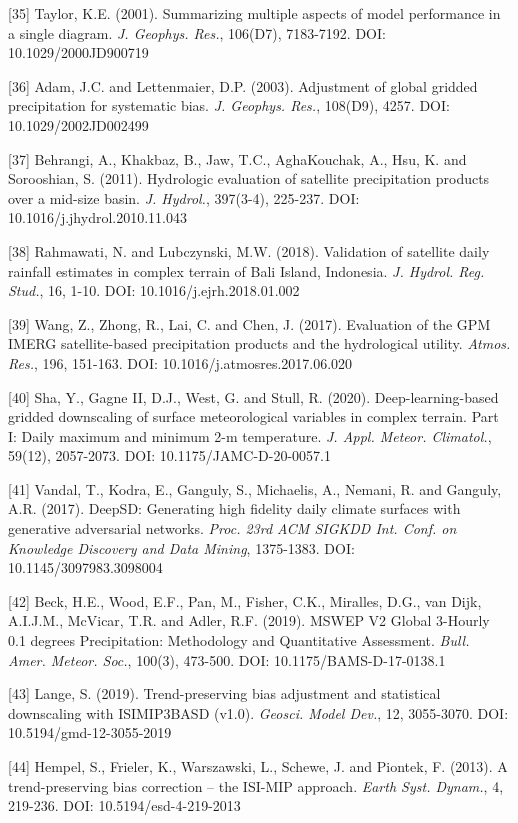 \documentclass[
]{article}
\begin{document}
{[}35{]} Taylor, K.E. (2001). Summarizing multiple aspects of model
performance in a single diagram. \emph{J. Geophys. Res.}, 106(D7),
7183-7192. DOI: 10.1029/2000JD900719

{[}36{]} Adam, J.C. and Lettenmaier, D.P. (2003). Adjustment of global
gridded precipitation for systematic bias. \emph{J. Geophys. Res.},
108(D9), 4257. DOI: 10.1029/2002JD002499

{[}37{]} Behrangi, A., Khakbaz, B., Jaw, T.C., AghaKouchak, A., Hsu, K.
and Sorooshian, S. (2011). Hydrologic evaluation of satellite
precipitation products over a mid-size basin. \emph{J. Hydrol.},
397(3-4), 225-237. DOI: 10.1016/j.jhydrol.2010.11.043

{[}38{]} Rahmawati, N. and Lubczynski, M.W. (2018). Validation of
satellite daily rainfall estimates in complex terrain of Bali Island,
Indonesia. \emph{J. Hydrol. Reg. Stud.}, 16, 1-10. DOI:
10.1016/j.ejrh.2018.01.002

{[}39{]} Wang, Z., Zhong, R., Lai, C. and Chen, J. (2017). Evaluation of
the GPM IMERG satellite-based precipitation products and the
hydrological utility. \emph{Atmos. Res.}, 196, 151-163. DOI:
10.1016/j.atmosres.2017.06.020

{[}40{]} Sha, Y., Gagne II, D.J., West, G. and Stull, R. (2020).
Deep-learning-based gridded downscaling of surface meteorological
variables in complex terrain. Part I: Daily maximum and minimum 2-m
temperature. \emph{J. Appl. Meteor. Climatol.}, 59(12), 2057-2073. DOI:
10.1175/JAMC-D-20-0057.1

{[}41{]} Vandal, T., Kodra, E., Ganguly, S., Michaelis, A., Nemani, R.
and Ganguly, A.R. (2017). DeepSD: Generating high fidelity daily climate
surfaces with generative adversarial networks. \emph{Proc. 23rd ACM
SIGKDD Int. Conf. on Knowledge Discovery and Data Mining}, 1375-1383.
DOI: 10.1145/3097983.3098004

{[}42{]} Beck, H.E., Wood, E.F., Pan, M., Fisher, C.K., Miralles, D.G.,
van Dijk, A.I.J.M., McVicar, T.R. and Adler, R.F. (2019). MSWEP V2
Global 3-Hourly 0.1 degrees Precipitation: Methodology and Quantitative
Assessment. \emph{Bull. Amer. Meteor. Soc.}, 100(3), 473-500. DOI:
10.1175/BAMS-D-17-0138.1

{[}43{]} Lange, S. (2019). Trend-preserving bias adjustment and
statistical downscaling with ISIMIP3BASD (v1.0). \emph{Geosci. Model
Dev.}, 12, 3055-3070. DOI: 10.5194/gmd-12-3055-2019

{[}44{]} Hempel, S., Frieler, K., Warszawski, L., Schewe, J. and
Piontek, F. (2013). A trend-preserving bias correction -- the ISI-MIP
approach. \emph{Earth Syst. Dynam.}, 4, 219-236. DOI:
10.5194/esd-4-219-2013
\end{document}
